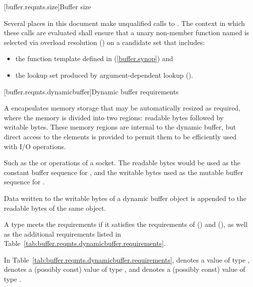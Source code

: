[buffer.reqmts.size]{Buffer size}

\pnum
Several places in this document make unqualified calls to .
The context in which these calls are evaluated shall ensure that
a unary non-member function named 
is selected via overload resolution ()
on a candidate set that includes:

\begin{itemize}
\item the  function template defined in  (\ref{buffer.synop}) and
\item the lookup set produced by argument-dependent lookup ().
\end{itemize}


[buffer.reqmts.dynamicbuffer]{Dynamic buffer requirements}

\pnum
A  encapsulates memory storage that may be automatically resized as required, where the memory is divided into two regions: readable bytes followed by writable bytes. These memory regions are internal to the dynamic buffer, but direct access to the elements is provided to permit them to be efficiently used with I/O operations. \begin{note} Such as the  or  operations of a socket. The readable bytes would be used as the constant buffer sequence for , and the writable bytes used as the mutable buffer sequence for . \end{note} Data written to the writable bytes of a dynamic buffer object is appended to the readable bytes of the same object.

\pnum
A type  meets the  requirements if it satisfies the requirements of  () and  (), as well as the additional requirements listed in Table~\ref{tab:buffer.reqmts.dynamicbuffer.requirements}.

\pnum
In Table~\ref{tab:buffer.reqmts.dynamicbuffer.requirements},
 denotes a value of type ,
 denotes a (possibly const) value of type ,
and  denotes a (possibly const) value of type .

